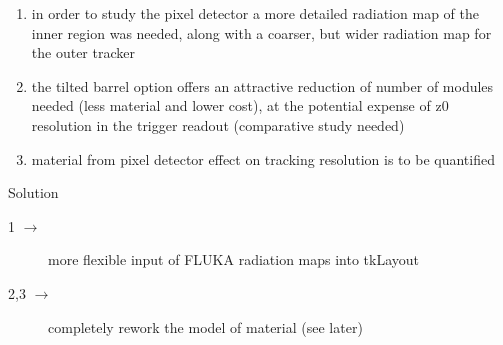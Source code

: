 \documentclass[pdftex, 11pt]{beamer}
\begin{document}
\begin{frame}
        
\end{frame}

\begin{frame}
  \begin{enumerate}
  \item in order to \alert{study} the \alert{pixel} detector a more \alert{detailed} radiation
    \alert{map} of the inner region was needed, along with a coarser, but
    wider radiation map for the outer tracker
    \pause
  \item the \alert{tilted} barrel option offers an attractive \alert{reduction} of
    number of \alert{modules} needed (less material and lower cost), at the
    potential expense of \alert{z0 resolution} in the trigger readout
    (comparative study needed)
    \pause
  \item \alert{material} from \alert{pixel} detector \alert{effect} on tracking resolution is to be quantified 
  \end{enumerate}
  \pause
  \begin{block}{Solution}
    \begin{description}
    \item[1 $\rightarrow$] more \alert{flexible} input of \alert{FLUKA} radiation maps into tkLayout
    \item[2,3 $\rightarrow$] completely \alert{rework} the \alert{model} of \alert{material} (see later)
    \end{description}
  \end{block}
\end{frame}
\end{document}
